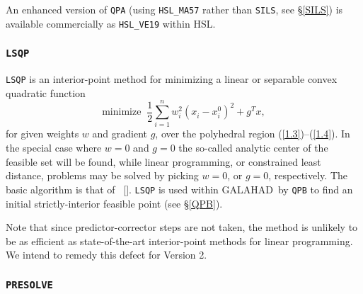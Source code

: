 \documentclass[acmtocl,acmnow]{acmtrans2m}
\newcommand{\req}[1]{(\ref{#1})}
\newcommand{\sfrac}[2]{{\scriptstyle \frac{#1}{#2}}}
\newcommand{\half}{\sfrac{1}{2}}
\newcommand{\gal}{{\sf GALAHAD}}
\newcommand{\ltsubsubsection}[1]{\subsubsection{{\tt #1}} \label{#1}}
\newcommand{\citebb}[1]{\citeauthor{#1}\ [\citeyear{#1}]}
\newcommand{\disp}[1]{\[{#1}\]}
\begin{document}
An enhanced version of {\tt QPA} (using {\tt HSL\_MA57} rather than {\tt SILS},
see \S\ref{SILS}) is available commercially as {\tt HSL\_VE19} within HSL.

\ltsubsubsection{LSQP}

{\tt LSQP} is an interior-point method for minimizing a linear or
separable convex quadratic function
\disp{\mbox{minimize}\;\; \half {\sum_{i=1}^n w_i^2
 ( x_{i}^{ } - x_{i}^{0} )^{2}} + g^T x,}
for given weights $w$ and gradient $g$,
over the polyhedral region \req{1.3}--\req{1.4}.
In the special case where $w = 0$ and $g = 0$
the so-called analytic center of the feasible set will be found,
while linear programming, or constrained least distance, problems
may be solved by picking $w = 0$, or $g = 0$, respectively.
The basic algorithm is that of \citebb{Zhan94}.
{\tt LSQP} is used within \gal\ by {\tt QPB} to find an initial
strictly-interior feasible point (see \S\ref{QPB}).

Note that since predictor-corrector steps are not taken, the method
is unlikely to be as efficient as state-of-the-art interior-point
methods for linear programming. We intend to remedy this defect for
Version 2.

\ltsubsubsection{PRESOLVE}
\end{document}
